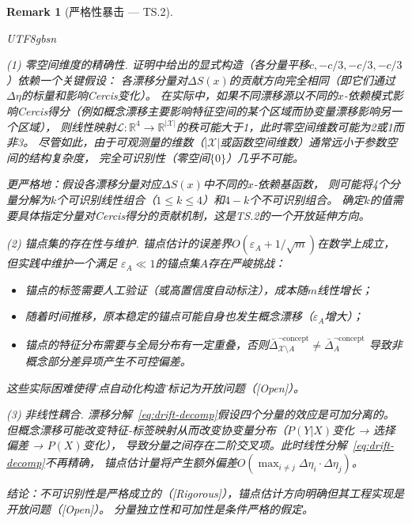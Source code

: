 \documentclass[12pt,a4paper]{article}
\newtheorem{remark}[theorem]{Remark}
\newcommand{\rigorous}{\textcolor{green!50!black}{\small\textsf{[Rigorous]}}}
\newcommand{\openquest}{\textcolor{red!70!black}{\small\textsf{[Open]}}}
\newcommand{\R}{\mathbb{R}}
\newcommand{\cX}{\mathcal{X}}
\begin{document}
\medskip\noindent
\begin{remark}[严格性暴击 --- TS.2]
\label{crit:ts2}
\begin{CJK}{UTF8}{gbsn}

\emph{(1) 零空间维度的精确性.}
证明中给出的显式构造（各分量平移$c, -c/3, -c/3, -c/3$）依赖一个关键假设：
各漂移分量对$\Delta S(x)$的贡献方向完全相同（即它们通过$\Delta\eta$的标量和影响Cercis变化）。
在实际中，如果不同漂移源以不同的$x$-依赖模式影响Cercis得分（例如概念漂移主要影响特征空间的某个区域而协变量漂移影响另一个区域），
则线性映射$\mathcal{L}: \R^4 \to \R^{|\cX|}$的秩可能大于1，此时零空间维数可能为2或1而非3。
尽管如此，由于可观测量的维数（$|\cX|$或函数空间维数）通常远小于参数空间的结构复杂度，
完全可识别性（零空间$\{0\}$）几乎不可能。

更严格地：假设各漂移分量对应$\Delta S(x)$中不同的$x$-依赖基函数，
则可能将4个分量分解为$k$个可识别线性组合（$1\le k \le 4$）和$4-k$个不可识别组合。
确定$k$的值需要具体指定分量对Cercis得分的贡献机制，这是TS.2的一个开放延伸方向。

\emph{(2) 锚点集的存在性与维护.}
锚点估计的误差界$O(\varepsilon_A + 1/\sqrt{m})$在数学上成立，但实践中维护一个满足
$\varepsilon_A \ll 1$的锚点集$A$存在严峻挑战：
\begin{itemize}
\item 锚点的标签需要人工验证（或高置信度自动标注），成本随$m$线性增长；
\item 随着时间推移，原本稳定的锚点可能自身也发生概念漂移（$\varepsilon_A$增大）；
\item 锚点的特征分布需要与全局分布有一定重叠，否则$\bar\Delta^{\neg\text{concept}}_{\cX\setminus A} \neq \bar\Delta^{\neg\text{concept}}_A$
导致非概念部分差异项产生不可控偏差。
\end{itemize}
这些实际困难使得\"锚点自动化构造\"被标记为开放问题（\openquest）。

\emph{(3) 非线性耦合.}
漂移分解~\eqref{eq:drift-decomp}假设四个分量的效应是可加分离的。
但概念漂移可能改变特征-标签映射从而改变协变量分布（$P(Y|X)$变化 → 选择偏差 → $P(X)$变化），
导致分量之间存在二阶交叉项。此时线性分解~\eqref{eq:drift-decomp}不再精确，
锚点估计量将产生额外偏差$O(\max_{i\neq j}\Delta\eta_i\cdot\Delta\eta_j)$。

\emph{结论：}不可识别性是严格成立的（\rigorous），锚点估计方向明确但其工程实现是开放问题（\openquest）。
分量独立性和可加性是条件严格的假定。
\end{CJK}
\end{remark}
\end{document}
